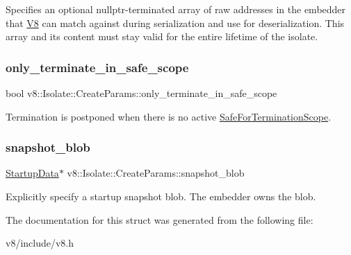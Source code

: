 Specifies an optional nullptr-\/terminated array of raw addresses in the embedder that \mbox{\hyperlink{classv8_1_1V8}{V8}} can match against during serialization and use for deserialization. This array and its content must stay valid for the entire lifetime of the isolate. \mbox{\label{structv8_1_1Isolate_1_1CreateParams_af44a854a07944452589128b6cf3b9958}} 
\subsubsection{\texorpdfstring{only\+\_\+terminate\+\_\+in\+\_\+safe\+\_\+scope}{only\_terminate\_in\_safe\_scope}}
{\footnotesize\ttfamily bool v8\+::\+Isolate\+::\+Create\+Params\+::only\+\_\+terminate\+\_\+in\+\_\+safe\+\_\+scope}

Termination is postponed when there is no active \mbox{\hyperlink{classv8_1_1Isolate_1_1SafeForTerminationScope}{Safe\+For\+Termination\+Scope}}. \mbox{\label{structv8_1_1Isolate_1_1CreateParams_a25d38476e4dec79ae96c59292eee4a64}} 
\subsubsection{\texorpdfstring{snapshot\+\_\+blob}{snapshot\_blob}}
{\footnotesize\ttfamily \mbox{\hyperlink{classv8_1_1StartupData}{Startup\+Data}}$\ast$ v8\+::\+Isolate\+::\+Create\+Params\+::snapshot\+\_\+blob}

Explicitly specify a startup snapshot blob. The embedder owns the blob. 

The documentation for this struct was generated from the following file\+:\begin{DoxyCompactItemize}
\item 
v8/include/v8.\+h\end{DoxyCompactItemize}
